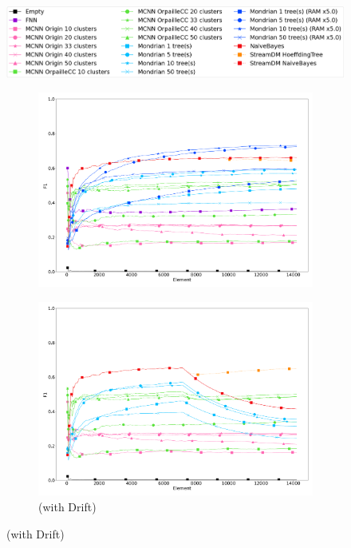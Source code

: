 \begin{figure}
	\centering
	\includegraphics[width=0.8\linewidth]{figures/legend.png}
	\begin{subfigure}[t]{.49\linewidth}
		\includegraphics[width=\linewidth]{figures/results/banos_6_f1.png}
		\caption{\banosdataset}
		\label{fig:f1-banos}
	\end{subfigure}
	\begin{subfigure}[t]{.49\linewidth}
		\includegraphics[width=\linewidth]{figures/results/drift_6_f1.png}
		\caption{\banosdataset (with Drift)}
		\label{fig:f1-drift}

\end{subfigure}
\end{figure}
